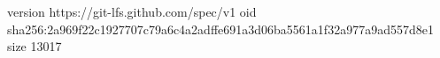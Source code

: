 version https://git-lfs.github.com/spec/v1
oid sha256:2a969f22c1927707c79a6c4a2adffe691a3d06ba5561a1f32a977a9ad557d8e1
size 13017
